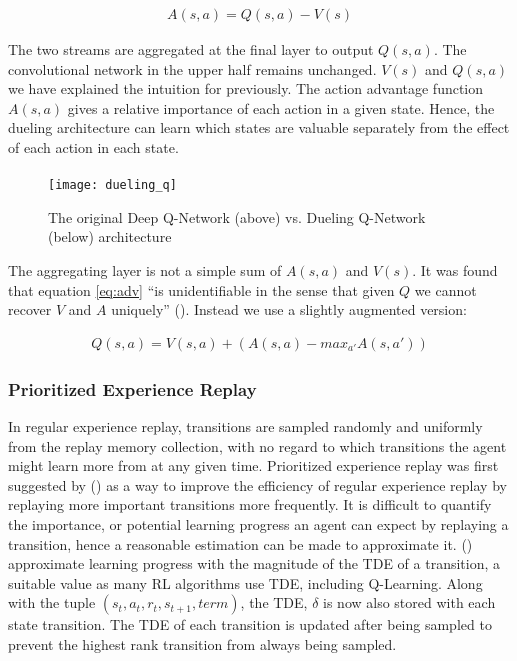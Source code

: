 \begin{align}
    \label{eq:adv}
    A(s, a) =  Q(s, a) - V(s)
\end{align}

The two streams are aggregated at the final layer to output $Q(s, a)$. The convolutional network in the upper half remains unchanged. $V(s)$ and $Q(s, a)$ we have explained the intuition for previously. The action advantage function $A(s, a)$ gives a relative importance of each action in a given state. Hence, the dueling architecture can learn which states are valuable separately from the effect of each action in each state. \paragraph{}

\begin{figure}[h]
    \centering
    \texttt{[image: dueling\_q]}
    \caption{The original Deep Q-Network (above) vs. Dueling Q-Network (below) architecture}
\end{figure}

The aggregating layer is not a simple sum of $A(s, a)$ and $V(s)$. It was found that equation \ref{eq:adv} ``is unidentifiable in the sense that given $Q$ we cannot recover $V$ and $A$ uniquely'' (\cite{dueling}). Instead we use a slightly augmented version:

\begin{align}
    Q(s, a) = V(s, a) + (A(s, a) - max_{a'} A(s, a'))
\end{align}

\subsubsection{Prioritized Experience Replay}
In regular experience replay, transitions are sampled randomly and uniformly from the replay memory collection, with no regard to which transitions the agent might learn more from at any given time. Prioritized experience replay was first suggested by (\cite{prioritized}) as a way to improve the efficiency of regular experience replay by replaying more important transitions more frequently. It is difficult to quantify the importance, or potential learning progress an agent can expect by replaying a transition, hence a reasonable estimation can be made to approximate it. (\cite{prioritized}) approximate learning progress with the magnitude of the TDE of a transition, a suitable value as many RL algorithms use TDE, including Q-Learning. Along with the tuple $(s_t, a_t, r_{t}, s_{t+1}, term)$, the TDE, $\delta$ is now also stored with each state transition. The TDE of each transition is updated after being sampled to prevent the highest rank transition from always being sampled. \paragraph{}

